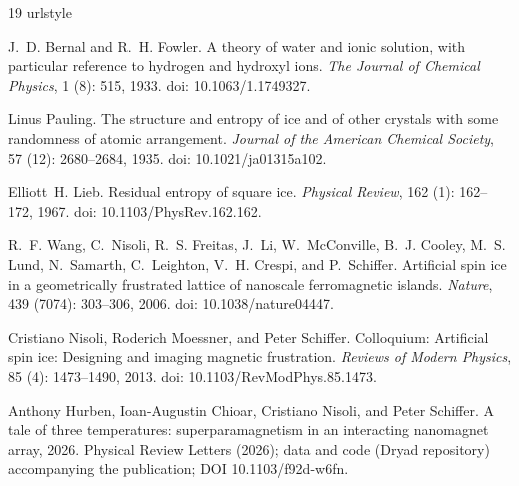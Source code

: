 \documentclass[11pt,a4paper]{article}
\theoremstyle{plain}
\theoremstyle{definition}
\theoremstyle{remark}
\begin{document}
\begin{thebibliography}{19}
\providecommand{\natexlab}[1]{#1}
\providecommand{\url}[1]{\texttt{#1}}
\expandafter\ifx\csname urlstyle\endcsname\relax
  \providecommand{\doi}[1]{doi: #1}\else
  \providecommand{\doi}{doi: \begingroup \urlstyle{rm}\Url}\fi

J.~D. Bernal and R.~H. Fowler.
\newblock A theory of water and ionic solution, with particular reference to
  hydrogen and hydroxyl ions.
\newblock \emph{The Journal of Chemical Physics}, 1 (8): 515,
  1933.
\newblock \doi{10.1063/1.1749327}.

Linus Pauling.
\newblock The structure and entropy of ice and of other crystals with some
  randomness of atomic arrangement.
\newblock \emph{Journal of the American Chemical Society}, 57
  (12): 2680--2684, 1935.
\newblock \doi{10.1021/ja01315a102}.

Elliott~H. Lieb.
\newblock Residual entropy of square ice.
\newblock \emph{Physical Review}, 162 (1): 162--172, 1967.
\newblock \doi{10.1103/PhysRev.162.162}.

R.~F. Wang, C.~Nisoli, R.~S. Freitas, J.~Li, W.~McConville, B.~J. Cooley, M.~S.
  Lund, N.~Samarth, C.~Leighton, V.~H. Crespi, and P.~Schiffer.
\newblock Artificial spin ice in a geometrically frustrated lattice of
  nanoscale ferromagnetic islands.
\newblock \emph{Nature}, 439 (7074): 303--306, 2006.
\newblock \doi{10.1038/nature04447}.

Cristiano Nisoli, Roderich Moessner, and Peter Schiffer.
\newblock Colloquium: Artificial spin ice: Designing and imaging magnetic
  frustration.
\newblock \emph{Reviews of Modern Physics}, 85 (4):
  1473--1490, 2013.
\newblock \doi{10.1103/RevModPhys.85.1473}.

Anthony Hurben, Ioan-Augustin Chioar, Cristiano Nisoli, and Peter Schiffer.
\newblock A tale of three temperatures: superparamagnetism in an interacting
  nanomagnet array, 2026.
\newblock Physical Review Letters (2026); data and code (Dryad repository)
  accompanying the publication; DOI 10.1103/f92d-w6fn.


\end{thebibliography}
\end{document}
